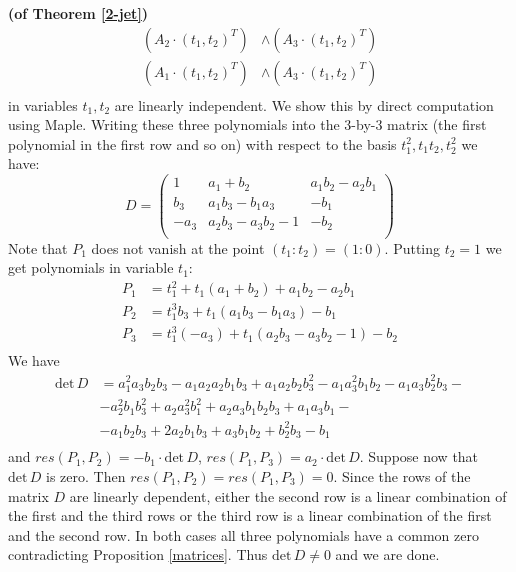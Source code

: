 \documentclass[10pt,a4paper]{amsart}
\renewenvironment{proof}[1]{\par\medskip\noindent\textbf{#1}\enspace\ignorespaces}{\par\medskip}
\begin{document}
\begin{proof}{(of Theorem \ref{2-jet})}
\begin{align*}
    (A_2 \cdot (t_1, t_2)^T) &\wedge (A_3 \cdot (t_1, t_2)^T)\\
    (A_1 \cdot (t_1, t_2)^T) &\wedge (A_3 \cdot (t_1, t_2)^T)\\
    \end{align*}
    in variables $t_1, t_2$ are linearly independent.
    We show this by direct computation using Maple.
    Writing these three polynomials into the $3$-by-$3$ matrix (the first polynomial in the first row and so on) with respect to the basis $t_1^2, t_1 t_2, t_2^2$ we have:
    \begin{equation*}
        D =\begin{pmatrix}
            1&a_1 + b_2 &a_1 b_2 - a_2 b_1  \\
            b_3&a_1 b_3 - b_1 a_3&-b_1      \\
            -a_3& a_2 b_3 - a_3 b_2 -1&-b_2 \\
        \end{pmatrix}
    \end{equation*}
    Note that $P_1$ does not vanish at the point $(t_1\colon t_2) = (1\colon 0)$. Putting $t_2 = 1$ we get polynomials in variable $t_1$:
    \begin{align*}
        P_1 &= t_1^2 + t_1(a_1 +b_2) + a_1 b_2 - a_2 b_1\\
        P_2 &= t_1^3 b_3 + t_1 (a_1 b_3 - b_1 a_3) - b_1\\
        P_3 &= t_1^3 (-a_3) +t_1(a_2 b_3 - a_3 b_2 -1) - b_2\\
    \end{align*}
    We have
    \begin{align*}
        \mathrm{det}\, D &= a_1^2 a_3 b_2 b_3 - a_1 a_2 a_2 b_1 b_3 + a_1 a_2 b_2 b_3^2 - a_1 a_3^2 b_1 b_2 - a_1 a_3 b_2^2 b_3 -\\
        &- a_2^2 b_1 b_3^2+a_2 a_3^2 b_1^2 + a_2 a_3 b_1 b_2 b_3 + a_1 a_3 b_1 -\\
        &-a_1 b_2 b_3 + 2 a_2 b_1 b_3 + a_3 b_1 b_2 + b_2^2 b_3 - b_1\\
    \end{align*}
    and $res(P_1, P_2) = -b_1 \cdot \mathrm{det} \, D$, $res(P_1, P_3) = a_2 \cdot \mathrm{det}\, D$. %
    Suppose now that $\mathrm{det}\, D$ is zero. Then $res(P_1, P_2) = res(P_1, P_3) = 0$.
    Since the rows of the matrix $D$ are linearly dependent, either the second row is a linear combination of the first and the third rows or the third row is a linear combination of the first and the second row.
    In both cases all three polynomials have a common zero contradicting Proposition \ref{matrices}.
    Thus $\mathrm{det}\, D \neq 0$ and we are done.
\end{proof}
\end{document}
